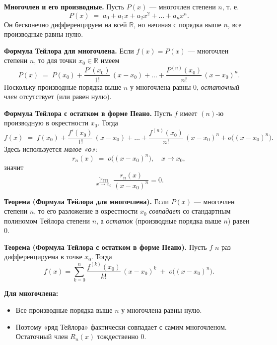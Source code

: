 

\textbf{Многочлен и его производные.}
Пусть $P(x)$ — многочлен степени $n$, т. е.
\[
P(x) \;=\; a_0 + a_1 x + a_2 x^2 + \dots + a_n x^n.
\]
Он бесконечно дифференцируем на всей $\mathbb{R}$, но начиная с порядка выше $n$, все производные равны нулю.

\medskip

\textbf{Формула Тейлора для многочлена.}
Если $f(x)=P(x)$ — многочлен степени $n$, то для точки $x_0\in\mathbb{R}$ имеем
\[
P(x) \;=\; P(x_0) + \frac{P'(x_0)}{1!}\,(x - x_0) + \dots + \frac{P^{(n)}(x_0)}{n!}\,(x - x_0)^n.
\]
Поскольку производные порядка выше $n$ у многочлена равны $0$, \textit{остаточный член} отсутствует (или равен нулю).

\medskip

\textbf{Формула Тейлора с остатком в форме Пеано.}
Пусть $f$ имеет $(n)$-ю производную в окрестности $x_0$. Тогда
\[
f(x) \;=\; f(x_0) + \frac{f'(x_0)}{1!}\,(x - x_0) + \dots + \frac{f^{(n)}(x_0)}{n!}\,(x - x_0)^n + o\bigl((x - x_0)^n\bigr).
\]
Здесь используется \emph{малое «о»}: 
\[
r_n(x) \;=\; o\bigl((x - x_0)^n\bigr),\quad x \to x_0,
\]
значит
\[
\lim_{x \to x_0} \frac{r_n(x)}{(x - x_0)^n} = 0.
\]

\medskip


\textbf{Теорема (Формула Тейлора для многочлена).}
Если $P(x)$ — многочлен степени $n$, то его разложение в окрестности $x_0$ \emph{совпадает} со стандартным полиномом Тейлора степени $n$, а \emph{остаток} (производные порядка выше $n$) равен $0$.

\textbf{Теорема (Формула Тейлора с остатком в форме Пеано).}
Пусть $f$ $n$ раз дифференцируема в точке $x_0$. Тогда
\[
f(x) = \sum_{k=0}^{n}\frac{f^{(k)}(x_0)}{k!}\,(x - x_0)^k \;+\; o\bigl((x - x_0)^n\bigr).
\]

\medskip


\textbf{Для многочлена:}
\begin{itemize}
  \item Все производные порядка выше $n$ у многочлена равны нулю.  
  \item Поэтому «ряд Тейлора» фактически совпадает с самим многочленом. Остаточный член $R_n(x)$ тождественно $0$.
\end{itemize}

